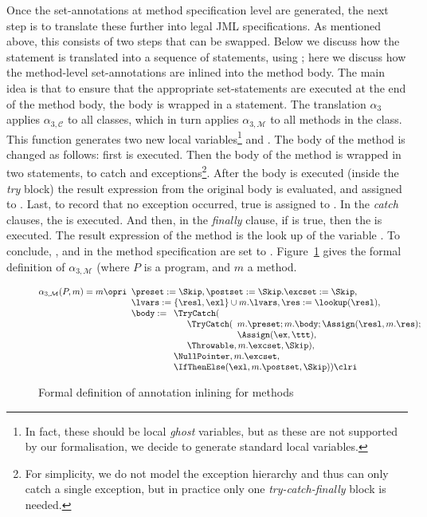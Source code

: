 Once the set-annotations at method specification level are generated,
the next step is to translate these further into legal JML
specifications. As mentioned above, this consists of two steps that
can be swapped. Below we discuss how the \CaseJML statement is
translated into a sequence of \Set statements, using \CondExpr;
here we discuss how the method-level set-annotations are inlined into
the method body. The main idea is that to ensure that the appropriate
set-statements are executed at the end of the method body, the body is
wrapped in a \TryCatch statement. The translation \(\alpha_3\) applies
\(\alpha_{3, \mathcal{C}}\) to all classes, which in turn applies
\(\alpha_{3, \mathcal{M}}\) to all methods in the class. This function
generates two new local variables\footnote{In fact, these should be
local \emph{ghost} variables, but as these are not supported by our
formalisation, we decide to generate standard local variables.} \resl
and \exl. The body of the method is changed as follows: first \preset
is executed. Then the body of the method is wrapped in two \TryCatch
statements, to catch \Throwable and \NullPointer
exceptions\footnote{For simplicity, we do not model the exception
hierarchy and thus \TryCatch can only catch a single
exception, but in practice only one \emph{try-catch-finally} block is needed.}.
After the body is executed (inside the \emph{try} block)
the result expression from the original body is evaluated, and
assigned to \resl. Last, to record that no exception occurred, true is
assigned to \exl. In the \emph{catch} clauses, the \excset is
executed. And then, in the \emph{finally} clause, if \resl is true,
then the \postset is executed. The result expression of the method is
the look up of the variable \resl. To conclude, \preset, \postset and
\excset in the method specification are set to
\Skip. Figure~\ref{FigInline} gives the formal definition of
\(\alpha_{3, \mathcal{M}}\) (where \(P\) is a program, and \(m\) a method.

\begin{figure}[t]
\[
\alpha_{3, \mathcal{M}}(P, m) = m \opri
\begin{array}[t]{l}
\preset := \Skip, \postset := \Skip. \excset := \Skip,\\
\lvars := \{\resl, \exl\} \cup m.\lvars,
\res := \lookup(\resl), \\
\body :=
\begin{array}[t]{l}
\TryCatch(\\
\quad \begin{array}[t]{l}
  \TryCatch(
  \begin{array}[t]{l}
   m.\preset; m.\body; \Assign(\resl, m.\res); \\
   \Assign(\ex, \ttt),
  \end{array}\\
  \Throwable, m.\excset, \Skip),
\end{array}\\
\NullPointer, m.\excset,\\
\IfThenElse(\exl, m.\postset, \Skip)) \clri
\end{array}
\end{array}
\]
\caption{Formal definition of annotation inlining for methods}\label{FigInline}
\end{figure}



